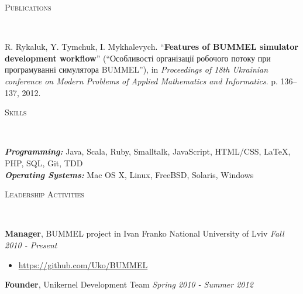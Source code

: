 \documentclass[9pt]{article}
\newenvironment{changemargin}[2]{%
  \begin{list}{}{%
    \setlength{\topsep}{0pt}%
    \setlength{\leftmargin}{#1}%
    \setlength{\rightmargin}{#2}%
    \setlength{\listparindent}{\parindent}%
    \setlength{\itemindent}{\parindent}%
    \setlength{\parsep}{\parskip}%
  }%
  \item[]}{\end{list}
}
\newcommand{\lineover}{
	\begin{changemargin}{-0.05in}{-0.05in}
		\vspace*{-8pt}
		\hrulefill \\
		\vspace*{-2pt}
	\end{changemargin}
}
\newcommand{\header}[1]{
	\begin{changemargin}{-0.5in}{-0.5in}
		\scshape{#1}\\
  	\lineover
	\end{changemargin}
}
\newenvironment{body} {
	\vspace*{-16pt}
	\begin{changemargin}{-0.25in}{-0.5in}
  }	
	{\end{changemargin}
}
\begin{document}
\smallskip

\header{Publications}

\begin{body}
	\vspace{14pt}
	R. Rykaluk, Y. Tymchuk, I. Mykhalevych. ``\textbf{Features of BUMMEL simulator development workflow}'' (``Особливості організації робочого потоку при програмуванні симулятора BUMMEL''), in \emph{Proceedings of 18th Ukrainian conference on Modern Problems of Applied Mathematics and Informatics}. p. 136--137, 2012.\\

\end{body}

\smallskip

\header{Skills}

\begin{body}
	\vspace{14pt}
	\emph{\textbf{Programming:}}{} Java, Scala, Ruby, Smalltalk, JavaScript, HTML/CSS, \LaTeX, PHP, SQL, Git, TDD\\
	\medskip
	\emph{\textbf{Operating Systems:}}{} Mac OS X, Linux, FreeBSD, Solaris, Windows\\
\end{body}

\smallskip


\header{Leadership Activities}

\begin{body}
	\vspace{14pt}
	\textbf{Manager}, BUMMEL project in Ivan Franko National University of Lviv \hfill{} \emph{Fall 2010 - Present}\\
	\vspace*{-4pt}
	\begin{itemize} \itemsep -0pt
		\item \url{https://github.com/Uko/BUMMEL}
	\end{itemize}
	\smallskip
	\textbf{Founder}, Unikernel Development Team \hfill {} \emph{Spring 2010 - Summer 2012}\\
\end{body}
\end{document}
